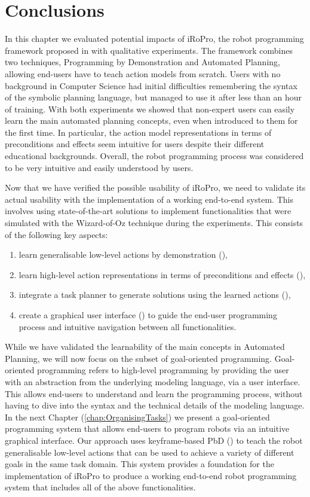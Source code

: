 \section{Conclusions}
In this chapter we evaluated potential impacts of iRoPro, the robot programming framework proposed in  with qualitative experiments. 
The framework combines two techniques, Programming by Demonstration and Automated Planning, allowing end-users have to teach action models from scratch.
Users with no background in Computer Science had initial difficulties remembering the syntax of the symbolic planning language, but managed to use it after less than an hour of training.
With both experiments we showed that non-expert users can easily learn the main automated planning concepts, even when introduced to them for the first time.
In particular, the action model representations in terms of preconditions and effects seem intuitive for users despite their different educational backgrounds.
Overall, the robot programming process was considered to be very intuitive and easily understood by users. 

Now that we have verified the possible usability of iRoPro, we need to validate its actual usability with the implementation of a working end-to-end system.
This involves using state-of-the-art solutions to implement functionalities that were simulated with the Wizard-of-Oz technique during the experiments. 
This consists of the following key aspects: 
\begin{enumerate}
	\item learn generalisable low-level actions by demonstration (\eg \cite{akgun2012keyframe,pastor2009learning}),
	\item learn high-level action representations in terms of preconditions and effects (\eg \cite{abdo2013learning,mollard2015robot}),
	\item integrate a task planner to generate solutions using the learned actions (\eg \cite{abdo2013learning}),
	\item create a graphical user interface (\eg \cite{alexandrova2014robot,huang2017code3}) to guide the end-user programming process and intuitive navigation between all functionalities.
\end{enumerate}

While we have validated the learnability of the main concepts in Automated Planning, we will now focus on the subset of goal-oriented programming. 
Goal-oriented programming refers to high-level programming by providing the user with an abstraction from the underlying modeling language, \eg via a user interface.
This allows end-users to understand and learn the programming process, without having to dive into the syntax and the technical details of the modeling language.
In the next Chapter (\ref{chap:OrganisingTasks}) we present a goal-oriented programming system that allows end-users to program robots via an intuitive graphical interface.
Our approach uses keyframe-based PbD (\cite{akgun2012keyframe}) to teach the robot generalisable low-level actions that can be used to achieve a variety of different goals in the same task domain.
This system provides a foundation for the implementation of iRoPro to produce a working end-to-end robot programming system that includes all of the above functionalities.